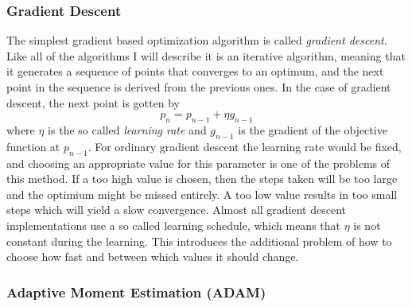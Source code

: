 \subsubsection{Gradient Descent}

The simplest gradient based optimization algorithm is called \emph{gradient
descent}.
Like all of the algorithms I will describe it is an iterative algorithm,
meaning that it generates a sequence of points that converges to an optimum,
and the next point in the sequence is derived from the previous ones.
In the case of gradient descent, the next point is gotten by
\begin{equation}
	p_n = p_{n-1} + \eta g_{n-1}
\end{equation}
where $\eta$ is the so called \emph{learning rate} and $g_{n-1}$ is the gradient
of the objective function at $p_{n-1}$.
For ordinary gradient descent the learning rate would be fixed,
and choosing an appropriate value for this parameter is one of the problems of
this method.
If a too high value is chosen, then the steps taken will be too large and the
optimium might be missed entirely.
A too low value results in too small steps which will yield a slow convergence.
Almost all gradient descent implementations use a so called learning schedule,
which means that $\eta$ is not constant during the learning.
This introduces the additional problem of how to choose how fast and between
which values it should change.

\subsubsection{Adaptive Moment Estimation (ADAM)}

